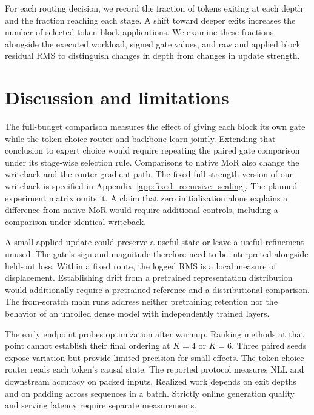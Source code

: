 \documentclass[11pt,letterpaper]{article}
\begin{document}
For each routing decision, we record the fraction of tokens exiting at each depth and the fraction reaching each stage. A shift toward deeper exits increases the number of selected token-block applications. We examine these fractions alongside the executed workload, signed gate values, and raw and applied block residual RMS to distinguish changes in depth from changes in update strength.

\section{Discussion and limitations}
The full-budget comparison measures the effect of giving each block its own gate while the token-choice router and backbone learn jointly. Extending that conclusion to expert choice would require repeating the paired gate comparison under its stage-wise selection rule. Comparisons to native MoR also change the writeback and the router gradient path. The fixed full-strength version of our writeback is specified in Appendix~\ref{app:fixed_recursive_scaling}. The planned experiment matrix omits it. A claim that zero initialization alone explains a difference from native MoR would require additional controls, including a comparison under identical writeback.

A small applied update could preserve a useful state or leave a useful refinement unused. The gate's sign and magnitude therefore need to be interpreted alongside held-out loss. Within a fixed route, the logged RMS is a local measure of displacement. Establishing drift from a pretrained representation distribution would additionally require a pretrained reference and a distributional comparison. The from-scratch main runs address neither pretraining retention nor the behavior of an unrolled dense model with independently trained layers.

The early endpoint probes optimization after warmup. Ranking methods at that point cannot establish their final ordering at \(K=4\) or \(K=6\). Three paired seeds expose variation but provide limited precision for small effects. The token-choice router reads each token's causal state. The reported protocol measures NLL and downstream accuracy on packed inputs. Realized work depends on exit depths and on padding across sequences in a batch. Strictly online generation quality and serving latency require separate measurements.
\end{document}
